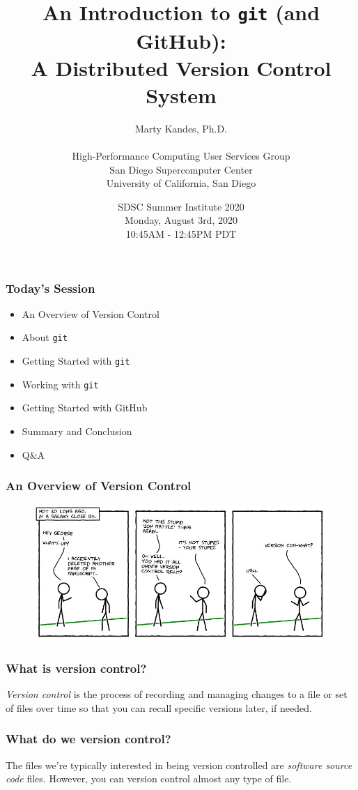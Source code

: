 \documentclass{beamer}
\title{An Introduction to \texttt{git} (and GitHub): \\
       \small A Distributed Version Control System}
\author{Marty Kandes, Ph.D. \\ \ \\
\small High-Performance Computing User Services Group \\
        San Diego Supercomputer Center \\
        University of California, San Diego}
\date{\small SDSC Summer Institute 2020\\
             Monday, August 3rd, 2020 \\
             10:45AM - 12:45PM PDT}
\begin{document}
\maketitle

\begin{frame}
   \frametitle{Today's Session}
   \begin{itemize}
      \setlength\itemsep{1.0em}
      \item An Overview of Version Control
      \item About \texttt{git}
      \item Getting Started with \texttt{git}
      \item Working with \texttt{git}
      \item Getting Started with GitHub
      \item Summary and Conclusion
      \item Q\&A
   \end{itemize}
\end{frame}

\begin{frame}
   \frametitle{An Overview of Version Control}
   \begin{figure}[htbp]
      \includegraphics[width=1.0\textwidth]{images/version-control-xkcd.jpg}
   \end{figure}
\end{frame}

\begin{frame}
   \frametitle{What is version control?}
   \textit{Version control} is the process of recording and managing 
   changes to a file or set of files over time so that you can recall 
   specific versions later, if needed.
\end{frame}

\begin{frame}
   \frametitle{What do we version control?}
   The files we're typically interested in being version 
   controlled are \textit{software source code} files. However, you can 
   version control almost any type of file.
   
\end{frame}
\end{document}
